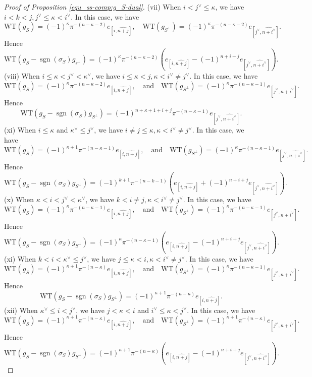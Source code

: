 \documentclass[pdflatex,sn-mathphys-num]{sn-jnl}%
\theoremstyle{thmstyleone}%
\theoremstyle{thmstyletwo}%
\numberwithin{equation}{subsection}
\theoremstyle{thmstylethree}%
\DeclareMathOperator{\sgn}{sgn}
\newcommand{\wh}{\widehat}
\newcommand{\WT}{\text{WT}}
\begin{document}
\begin{proof}[Proof of Proposition \ref{equ_ss-comp:g_S-dual}]
\noindent (vii) When $i<j^\vee\leq \kappa$, we have
$i<k<j,j^\vee\leq \kappa<i^\vee$. In this case, we have
\begin{equation*}
	\WT(g_S)=(-1)^\kappa\pi^{-(n-\kappa-2)}e_{[i,\wh{n+j}]},
	\quad
	\WT(g_{S^\perp})=(-1)^\kappa\pi^{-(n-\kappa-2)}e_{[j^\vee,\wh{n+i^\vee}]}.
\end{equation*}
Hence
\[
    \WT(g_S-\sgn(\sigma_S)g_{s^\perp})=(-1)^\kappa\pi^{-(n-\kappa-2)}
	\left(
	e_{[i,\wh{n+j}]}-(-1)^{n+i+j}e_{[j^\vee,\wh{n+i^\vee}]}
	\right).
\]
(viii) When $i\leq \kappa<j^\vee<\kappa^\vee$, we have
$i\leq \kappa<j,\kappa<i^\vee\neq j^\vee$. In this case, we have
\begin{equation*}
	\WT(g_S)=(-1)^\kappa\pi^{-(n-\kappa-2)}e_{[i,\wh{n+j}]},
	\quad\text{and}\quad
	\WT(g_{S^\perp})=(-1)^\kappa\pi^{-(n-\kappa-1)}e_{[j^\vee,\wh{n+i^\vee}]}.
\end{equation*}
Hence
\[
    \WT(g_S-\sgn(\sigma_S)g_{S^\perp})=(-1)^{n+\kappa+1+i+j}\pi^{-(n-\kappa-1)}e_{[j^\vee,\wh{n+i^\vee}]}.
\]
(xi) When $i\leq \kappa$ and $\kappa^\vee\leq j^\vee$, we have
$i\neq j\leq \kappa,\kappa<i^\vee\neq j^\vee$. In this case, we have
\begin{equation*}
	\WT(g_S)=(-1)^{\kappa+1}\pi^{-(n-\kappa-1)}e_{[i,\wh{n+j}]},
	\quad\text{and}\quad
	\WT(g_{S^\perp})=(-1)^\kappa\pi^{-(n-\kappa-1)}e_{[j^\vee,\wh{n+i^\vee}]}.
\end{equation*}
Hence
\[
	\WT(g_S-\sgn(\sigma_S)g_{S^\perp})=(-1)^{k+1}\pi^{-(n-k-1)}
	\left(
	e_{[i,\wh{n+j}]}+(-1)^{n+i+j}e_{[j^\vee,\wh{n+i^\vee}]}
	\right).
\]
(x) When $\kappa<i<j^\vee<\kappa^\vee$, we have
$k<i\neq j,\kappa<i^\vee\neq j^\vee$. In this case, we have
\begin{equation*}
	\WT(g_S)=(-1)^\kappa\pi^{-(n-\kappa-1)}e_{[i,\wh{n+j}]},
	\quad\text{and}\quad
	\WT(g_{S^\perp})=(-1)^\kappa\pi^{-(n-\kappa-1)}e_{[j^\vee,\wh{n+i^\vee}]}.
\end{equation*}
Hence
\[
    \WT(g_S-\sgn(\sigma_S)g_{S^\perp})=
	(-1)^\kappa\pi^{-(n-\kappa-1)}
    \left( 
	e_{[i,\wh{n+j}]}-(-1)^{n+i+j}e_{[j^\vee,\wh{n+i^\vee}]}
	\right).
\]
(xi) When $k<i<\kappa^\vee\leq j^\vee$, we have
$j\leq \kappa<i,\kappa<i^\vee\neq j^\vee$. In this case, we have
\begin{equation*}
	\WT(g_S)=(-1)^{\kappa+1}\pi^{-(n-\kappa)}e_{[i,\wh{n+j}]},
	\quad\text{and}\quad
	\WT(g_{S^\perp})=(-1)^\kappa\pi^{-(n-\kappa-1)}e_{[j^\vee,\wh{n+i^\vee}]}.
\end{equation*}
Hence
\[
	\WT(g_S-\sgn(\sigma_S)g_{S^\perp})=(-1)^{\kappa+1}\pi^{-(n-\kappa)}e_{[i,\wh{n+j}]}. 
\] 
(xii) When $\kappa^\vee\leq i<j^\vee$, we have
$j<\kappa<i$ and $i^{\vee}\le \kappa < j^{\vee}$. In this case, we have
\begin{equation*}
	\WT(g_S)=(-1)^{\kappa+1}\pi^{-(n-\kappa)}e_{[i,\wh{n+j}]},
	\quad\text{and}\quad
	\WT(g_{S^\perp})=(-1)^{\kappa+1}\pi^{-(n-\kappa)}e_{[j^\vee,\wh{n+i^\vee}]}.
\end{equation*}
Hence
\[
	\WT(g_S-\sgn(\sigma_S)g_{S^\perp})=(-1)^{\kappa+1}\pi^{-(n-\kappa)}\left(
	e_{[i,\wh{n+j}]}-(-1)^{n+i+j}e_{[j^\vee,\wh{n+i^\vee}]}
	\right).
\]
\end{proof}
		
\end{document}
